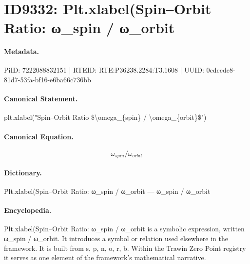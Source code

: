 \section*{ID9332: Plt.xlabel(Spin–Orbit Ratio: ω\_spin / ω\_orbit}
\paragraph{Metadata.}
PiID: 7222088832151 | RTEID: RTE:P36238.2284:T3.1608 | UUID: 0cdccde8-81d7-53fa-bf16-e6ba66c736bb

\paragraph{Canonical Statement.}
plt.xlabel("Spin–Orbit Ratio \$\textbackslash{}omega\_\{spin\} / \textbackslash{}omega\_\{orbit\}\$")

\paragraph{Canonical Equation.}
\[
\omega_{spin} / \omega_{orbit}
\]

\paragraph{Dictionary.}
Plt.xlabel(Spin–Orbit Ratio: ω\_spin / ω\_orbit — ω\_spin / ω\_orbit

\paragraph{Encyclopedia.}
Plt.xlabel(Spin–Orbit Ratio: ω\_spin / ω\_orbit is a symbolic expression, written ω\_spin / ω\_orbit. It introduces a symbol or relation used elsewhere in the framework. It is built from s, p, n, o, r, b. Within the Trawin Zero Point registry it serves as one element of the framework's mathematical narrative.
